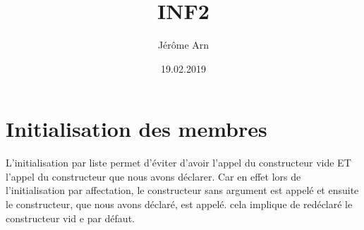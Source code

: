 \documentclass{article}
\title{INF2}
\author{Jérôme Arn}
\date{19.02.2019}
\begin{document}
\maketitle
\newpage

\tableofcontents
\newpage

\section{Initialisation des membres}
L'initialisation par liste permet d'éviter d'avoir l'appel du constructeur vide ET l'appel du constructeur que nous avons déclarer. Car en effet lors de l'initialisation par affectation, le constructeur sans argument est appelé et ensuite le constructeur, que nous avons déclaré, est appelé. cela implique de redéclaré le constructeur vid e par défaut. 
\end{document}

